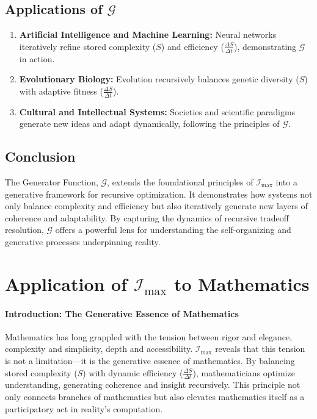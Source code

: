 \documentclass[12pt]{article}
\begin{document}
\subsection{Applications of \(\mathcal{G}\)}
\begin{enumerate}
    \item \textbf{Artificial Intelligence and Machine Learning:}
    Neural networks iteratively refine stored complexity (\(S\)) and efficiency (\(\frac{\Delta S}{\Delta t}\)), demonstrating \(\mathcal{G}\) in action.
    \item \textbf{Evolutionary Biology:}
    Evolution recursively balances genetic diversity (\(S\)) with adaptive fitness (\(\frac{\Delta S}{\Delta t}\)).
    \item \textbf{Cultural and Intellectual Systems:}
    Societies and scientific paradigms generate new ideas and adapt dynamically, following the principles of \(\mathcal{G}\).
\end{enumerate}

\subsection{Conclusion}
The Generator Function, \(\mathcal{G}\), extends the foundational principles of \(\mathcal{I}_{\text{max}}\) into a generative framework for recursive optimization. It demonstrates how systems not only balance complexity and efficiency but also iteratively generate new layers of coherence and adaptability. By capturing the dynamics of recursive tradeoff resolution, \(\mathcal{G}\) offers a powerful lens for understanding the self-organizing and generative processes underpinning reality.


\section{Application of \(\mathcal{I}_{\text{max}}\) to Mathematics}

\paragraph{Introduction: The Generative Essence of Mathematics}
Mathematics has long grappled with the tension between rigor and elegance, complexity and simplicity, depth and accessibility. \(\mathcal{I}_{\text{max}}\) reveals that this tension is not a limitation—it is the generative essence of mathematics. By balancing stored complexity (\(S\)) with dynamic efficiency (\(\frac{\Delta S}{\Delta t}\)), mathematicians optimize understanding, generating coherence and insight recursively. This principle not only connects branches of mathematics but also elevates mathematics itself as a participatory act in reality’s computation.
\end{document}
